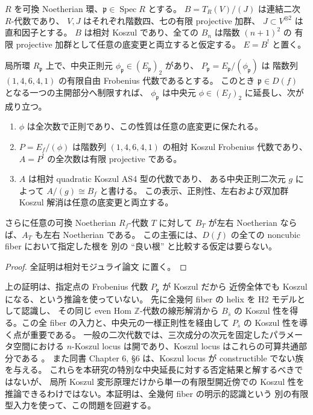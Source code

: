 \begin{lemma}[局所中央被覆の有限型近傍への延長]
\label{lem:spread-local-central-hull}
$R$ を可換 Noetherian 環、$\mathfrak p\in\operatorname{Spec}R$ とする。
$B=T_R(V)/(J)$ は連結二次 $R$-代数であり、
$V,J$ はそれぞれ階数四、七の有限 projective 加群、
$J\subset V^{\otimes2}$ は直和因子とする。
$B$ は相対 Koszul であり、全ての $B_n$ は階数 $(n+1)^2$ の
有限 projective 加群として任意の底変更と両立すると仮定する。
$E=B^!$ と置く。

局所環 $R_{\mathfrak p}$ 上で、中央正則元
$\phi_{\mathfrak p}\in(E_{\mathfrak p})_2$ があり、
$P_{\mathfrak p}=E_{\mathfrak p}/(\phi_{\mathfrak p})$ は
階数列 $(1,4,6,4,1)$ の有限自由 Frobenius 代数であるとする。
このとき $\mathfrak p\in D(f)$ となる一つの主開部分へ制限すれば、
$\phi_{\mathfrak p}$ は中央元 $\phi\in(E_f)_2$ に延長し、次が成り立つ。
\begin{enumerate}
\item $\phi$ は全次数で正則であり、この性質は任意の底変更に保たれる。
\item $P=E_f/(\phi)$ は階数列 $(1,4,6,4,1)$ の相対 Koszul
  Frobenius 代数であり、$A=P^!$ の全次数は有限 projective である。
\item $A$ は相対 quadratic Koszul AS4 型の代数であり、
  ある中央正則二次元 $g$ によって $A/(g)\cong B_f$ と書ける。
  この表示、正則性、左右および双加群 Koszul 解消は任意の底変更と両立する。
\end{enumerate}
さらに任意の可換 Noetherian $R_f$-代数 $T$ に対して $B_T$ が左右 Noetherian
ならば、$A_T$ も左右 Noetherian である。
この主張には、$D(f)$ の全ての noncubic fiber において指定した根を
別の ``良い根'' と比較する仮定は要らない。
\end{lemma}

\begin{proof}
全証明は相対モジュライ論文 \cite[noncubic有限型効果性]{QuadricModuli2026} に置く。
\end{proof}

\begin{remark}
上の証明は、指定点の Frobenius 代数 $P_{\mathfrak p}$ が Koszul だから
近傍全体でも Koszul になる、という推論を使っていない。
先に全幾何 fiber の helix を H2 モデルとして認識し、
その同じ even Hom $\mathbb Z$-代数の線形解消から $B_{\bar s}$ の
Koszul 性を得る。この全 fiber の入力と、中央元の一様正則性を経由して
$P_{\bar s}$ の Koszul 性を導く点が重要である。
一般の二次代数では、三次成分の次元を固定したパラメータ空間における
$n$-Koszul locus は開であり、Koszul locus はこれらの可算共通部分である
\cite[Chapter 6, Theorem 2.1 and Corollary 2.2]{PolishchukPositselski2005}。
また同書 Chapter 6, \S6 は、Koszul locus が constructible でない族を与える。
これらを本研究の特別な中央延長に対する否定結果と解するべきではないが、
局所 Koszul 変形原理だけから単一の有限型開近傍での Koszul 性を
推論できるわけではない。本証明は、全幾何 fiber の明示的認識という
別の有限型入力を使って、この問題を回避する。
\end{remark}


